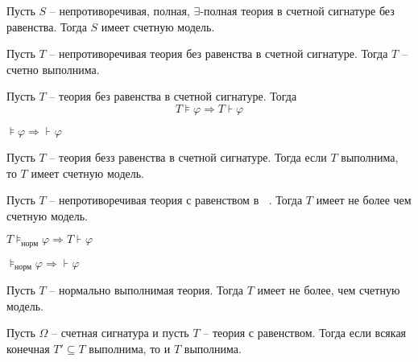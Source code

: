 \documentclass[unicode,10pt]{article}
\DeclareMathOperator{\PC}{PC_Ω}
\DeclareMathOperator{\PCe}{PC^=_Ω}
\begin{document}
\begin{lemma}
  Пусть $S$ -- непротиворечивая, полная, $∃$-полная теория в счетной
  сигнатуре без равенства.  Тогда $S$ имеет счетную модель.
\end{lemma}

\begin{theorem}
  Пусть $T$ -- непротиворечивая теория без равенства в счетной
  сигнатуре. Тогда $T$ -- счетно выполнима.
\end{theorem}

\begin{theorem}
  Пусть $T$ -- теория без равенства в счетной сигнатуре. Тогда
  \begin{equation*}
    T⊧φ ⇒T⊦φ
  \end{equation*}
\end{theorem}

\begin{theorem}
  \begin{math}
    \displaystyle
    ⊧φ ⇒ ⊦_{\PC}φ
  \end{math}
\end{theorem}

\begin{lemma}
  Пусть $T$ -- теория безз равенства в счетной сигнатуре. Тогда если
  $T$ выполнима, то $T$ имеет счетную модель.
\end{lemma}

\begin{lemma}
  Пусть $T$ -- непротиворечивая  теория с равенством в $\PCe$. Тогда $T$ имеет не более чем счетную модель.
\end{lemma}
\begin{theorem}
  \begin{math}
    T⊧_{\text{норм}}φ ⇒ T⊦_{\PCe}φ
  \end{math}
\end{theorem}

\begin{theorem}
  \begin{math}
    \displaystyle
    ⊧_{\text{норм}}φ ⇒ ⊦_{\PCe}φ
  \end{math}
\end{theorem}

\begin{theorem}
  Пусть $T$ -- нормально выполнимая теория. Тогда $T$ имеет не более, чем счетную модель.
\end{theorem}

\begin{theorem}
  Пусть $Ω$ -- счетная сигнатура и пусть $T$ -- теория с
  равенством. Тогда если всякая конечная $T'⊆T$ выполнима, то и $T$
  выполнима.
\end{theorem}
\end{document}
